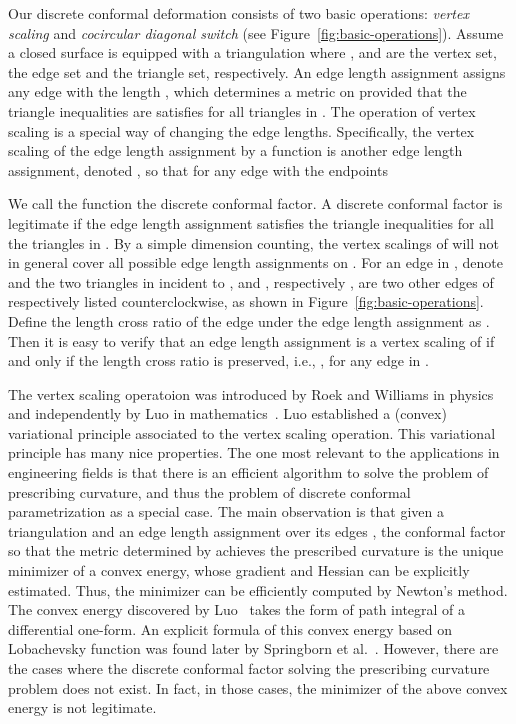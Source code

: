 \documentclass[11pt]{article}
\begin{document}
Our discrete conformal deformation consists of two basic operations:
{\it vertex scaling} and 
{\it cocircular diagonal switch} (see Figure~\ref{fig:basic-operations}). 
Assume a closed surface  
is equipped with a triangulation  where ,  and  are the vertex set, 
the edge set and the triangle set, respectively. An edge length assignment
 assigns any edge  with the length
, which determines a metric on  provided that
the triangle inequalities are satisfies for all triangles in . 
The operation of vertex scaling is a special way of changing the edge lengths. Specifically, 
the vertex scaling of the edge length assignment  by a 
function  is another edge length assignment, 
denoted , so that for any edge  with the endpoints  

We call the function  the discrete conformal factor. A discrete conformal factor 
is legitimate if the edge length assignment  satisfies the triangle inequalities
for all the triangles in . By a simple dimension counting,  the vertex scalings of  
will not in general cover all possible edge length assignments on .
For an edge  in , 
denote  and  the two triangles in  incident to , 
and , respectively , are two other edges of  respectively  listed
counterclockwise, as shown in Figure~\ref{fig:basic-operations}. Define the length cross ratio
of the edge  under the edge length assignment  as . 
Then it is easy to verify that an edge length assignment  is a vertex scaling of  if 
and only if the length cross ratio is preserved, i.e., , for any edge  
in . 


The vertex scaling operatoion was introduced by	Roek and Williams in physics~\cite{Rocek} 
and independently by Luo in mathematics~\cite{luo}. Luo established a (convex) variational principle 
associated to the vertex scaling operation.  This variational principle has many nice properties.
The one most relevant to the applications in engineering fields
is that there is an efficient algorithm to solve the problem of prescribing curvature, 
and thus the problem of discrete conformal parametrization as a special case. 
The main observation is that given a triangulation  and an edge length assignment 
over its edges , 
the conformal factor  so that the metric determined by  achieves 
the prescribed curvature is the unique minimizer of a convex energy, 
whose gradient and Hessian can be explicitly estimated. 
Thus, the minimizer can be efficiently computed by Newton's method. 
The convex energy discovered by Luo~\cite{luo} takes the form of path integral of 
a differential one-form.  An explicit formula of this convex energy based on Lobachevsky function
was found later by Springborn et al.~\cite{ssp}. 
However, there are the cases where the discrete conformal factor  solving the prescribing 
curvature problem does not exist. In fact, in those cases, the minimizer  of the above convex 
energy is not legitimate. 
\end{document}
